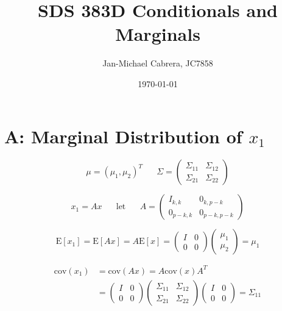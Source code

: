 \documentclass[12pt]{article}
\newcommand{\cov}{\text{cov}}
\newcommand{\E}{\text{E}}
\begin{document}
    \title{SDS 383D Conditionals and Marginals}
    \author{Jan-Michael Cabrera, JC7858}
    \date{\today}
    \maketitle

    \section*{A: Marginal Distribution of $x_1$}

        \begin{equation}
            \mu = (\mu_1, \mu_2)^T \hspace{20pt} \Sigma = \begin{pmatrix}
                                                            \Sigma_{11} & \Sigma_{12} \\
                                                            \Sigma_{21} & \Sigma_{22}
                                                        \end{pmatrix}
        \end{equation}

        \begin{equation}
            x_1 = Ax \hspace{20pt} \text{let} \hspace{20pt} A = \begin{pmatrix}
            I_{k,k} & 0_{k, p-k} \\
            0_{p-k, k} & 0_{p-k, p-k}
            \end{pmatrix}
        \end{equation}

        \begin{equation}
            \E[x_1] = \E[Ax] = A \E[x] = \begin{pmatrix} I & 0 \\ 0 & 0\end{pmatrix} \begin{pmatrix} \mu_1 \\ \mu_2\end{pmatrix} = \mu_1
        \end{equation}

        \begin{align}
            \cov(x_1) &= \cov(Ax) = A \cov(x) A^T \\
            &= \begin{pmatrix} I & 0 \\ 0 & 0 \end{pmatrix} \begin{pmatrix} \Sigma_{11} & \Sigma_{12} \\\Sigma_{21} & \Sigma_{22} \end{pmatrix} \begin{pmatrix} I & 0 \\ 0 & 0 \end{pmatrix} = \Sigma_{11}
         \end{align}
\end{document}
